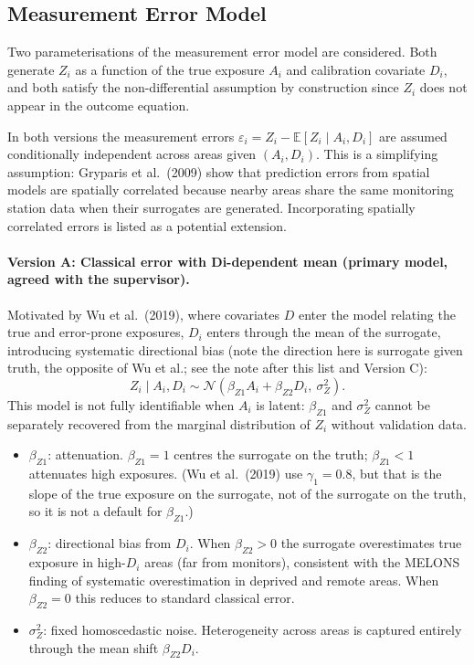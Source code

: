 \documentclass[11pt]{article}
\begin{document}
\subsection{Measurement Error Model}

Two parameterisations of the measurement error model are considered. Both generate $Z_i$
as a function of the true exposure $A_i$ and calibration covariate $D_i$, and both
satisfy the non-differential assumption by construction since $Z_i$ does not appear in
the outcome equation.

In both versions the measurement errors $\varepsilon_i = Z_i - \mathbb{E}[Z_i \mid A_i, D_i]$
are assumed conditionally independent across areas given $(A_i, D_i)$. This is a
simplifying assumption: Gryparis et al.\ (2009) show that prediction errors from spatial
models are spatially correlated because nearby areas share the same monitoring station
data when their surrogates are generated. Incorporating spatially correlated errors is
listed as a potential extension.

\paragraph{Version A: Classical error with Di-dependent mean (primary model, agreed with the supervisor).}

Motivated by Wu et al.\ (2019), where covariates $D$ enter the model relating the true and
error-prone exposures, $D_i$ enters through the mean of the surrogate, introducing systematic
directional bias (note the direction here is surrogate given truth, the opposite of Wu et al.;
see the note after this list and Version C):
\begin{equation}
Z_i \mid A_i, D_i \sim \mathcal{N}(\beta_{Z1} A_i + \beta_{Z2} D_i,\ \sigma_Z^2).
\label{eq:errorA}
\end{equation}
This model is not fully identifiable when $A_i$ is latent: $\beta_{Z1}$ and $\sigma_Z^2$
cannot be separately recovered from the marginal distribution of $Z_i$ without validation
data.

\begin{itemize}
\item \textbf{$\beta_{Z1}$}: attenuation. $\beta_{Z1} = 1$ centres the surrogate on the
truth; $\beta_{Z1} < 1$ attenuates high exposures. (Wu et al.\ (2019) use $\gamma_1 = 0.8$, but that is the
slope of the true exposure on the surrogate, not of the surrogate on the truth, so it is not a default for
$\beta_{Z1}$.)
\item \textbf{$\beta_{Z2}$}: directional bias from $D_i$. When $\beta_{Z2} > 0$ the
surrogate overestimates true exposure in high-$D_i$ areas (far from monitors), consistent
with the MELONS finding of systematic overestimation in deprived and remote areas. When
$\beta_{Z2} = 0$ this reduces to standard classical error.
\item \textbf{$\sigma_Z^2$}: fixed homoscedastic noise. Heterogeneity across areas is
captured entirely through the mean shift $\beta_{Z2} D_i$.
\end{itemize}
\end{document}
